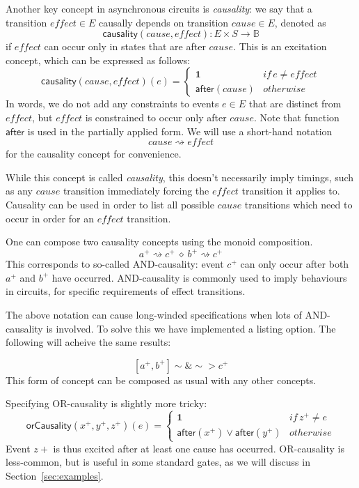 \documentclass[british, journal]{IEEEtran}
\begin{document}
Another key concept in asynchronous circuits is \emph{causality}:
we say that a transition $\mathit{effect}\in E$ causally depends
on transition $\mathit{cause}\in E$, denoted as
\[
\mathsf{causality}(\mathit{cause},\mathit{effect}):E\times
S\rightarrow\mathbb{B}
\]
 if $\mathit{effect}$ can occur only in states that are after $\mathit{cause}$.
This is an excitation concept, which can be expressed as follows:
\[
\mathsf{causality}(\mathit{cause},\mathit{effect})(e)\!=\!\begin{cases}
\mathbf{1} & \mathit{if}\, e\neq\mathit{effect}\\
\mathsf{after}(cause) & \mathit{otherwise}
\end{cases}
\]
In words, we do not add any constraints to events $e\in E$ that are
distinct from $\mathit{effect}$, but $\mathit{effect}$ is constrained
to occur only after $\mathit{cause}$. Note that function $\mathsf{after}$
is used in the partially applied form. We will use a short-hand notation
\[
\mathit{cause}\rightsquigarrow\mathit{effect}
\]
for the causality concept for convenience.
 
While this concept is called \emph{causality}, this doesn't necessarily imply
timings, such as any $\mathit{cause}$ transition immediately forcing the
 $\mathit{effect}$ transition it applies to. Causality can be used in order to
list all possible $\mathit{cause}$ transitions which need to occur in order
 for an $\mathit{effect}$ transition.

One can compose two causality concepts using the monoid composition.
\[
a^{+}\rightsquigarrow c^{+}\ \diamond\ b^{+}\rightsquigarrow c^{+}
\]
This corresponds to so-called AND-causality: event $c^{+}$ can only occur
after both $a^{+}$ and $b^{+}$ have occurred. AND-causality is commonly used
to imply behaviours in circuits, for specific requirements of effect transitions.  

The above notation can cause long-winded specifications when lots of AND-causality is involved. 
To solve this we have implemented a listing option. The following will acheive the same results:

\vspace{-3mm}

\[
[a^{+}, b^{+}]\sim\&\sim>c^{+}
\]
This form of concept can be composed as usual with any other concepts.

Specifying OR-causality is slightly more tricky:
\[
\mathsf{orCausality}(x^{+},y^{+},z^{+})(e)=\begin{cases}
\mathbf{1} & \mathit{if}\, z^{+}\neq\mathit{e}\\
\mathsf{after}(x^{+})\vee\mathsf{after}(y^{+}) & \mathit{otherwise}
\end{cases}
\]
Event $z+$ is thus excited after at least one cause has occurred. OR-causality is less-common,
but is useful in some standard gates, as we will discuss in Section~\ref{sec:examples}.
\end{document}
